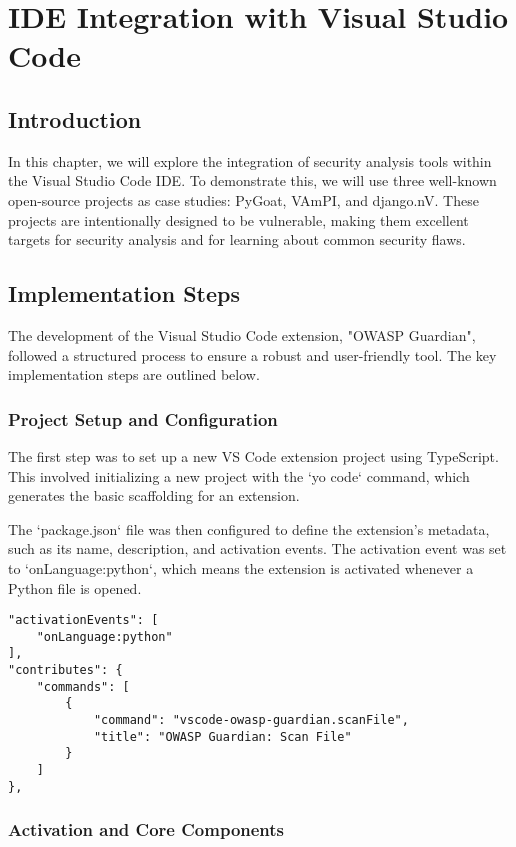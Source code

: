 \chapter{IDE Integration with Visual Studio Code}
\label{chap:ide}


\section{Introduction}

In this chapter, we will explore the integration of security analysis tools within the Visual Studio Code IDE. To demonstrate this, we will use three well-known open-source projects as case studies: PyGoat, VAmPI, and django.nV. These projects are intentionally designed to be vulnerable, making them excellent targets for security analysis and for learning about common security flaws.

\section{Implementation Steps}

The development of the Visual Studio Code extension, "OWASP Guardian", followed a structured process to ensure a robust and user-friendly tool. The key implementation steps are outlined below.

\subsection{Project Setup and Configuration}

The first step was to set up a new VS Code extension project using TypeScript. This involved initializing a new project with the `yo code` command, which generates the basic scaffolding for an extension.

The `package.json` file was then configured to define the extension's metadata, such as its name, description, and activation events. The activation event was set to `onLanguage:python`, which means the extension is activated whenever a Python file is opened.

\begin{verbatim}
"activationEvents": [
    "onLanguage:python"
],
"contributes": {
    "commands": [
        {
            "command": "vscode-owasp-guardian.scanFile",
            "title": "OWASP Guardian: Scan File"
        }
    ]
},
\end{verbatim}

\subsection{Activation and Core Components}

